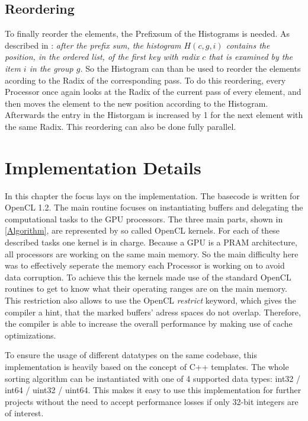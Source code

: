 \documentclass{llncs}
\begin{document}
\subsection{Reordering}
To finally reorder the elements, the Prefixsum of the Histograms is needed. As described in \cite{ocl-radix-helluy}: \textit{after the prefix sum, the histogram $H(c, g, i)$ contains the position, in the ordered list, of the first key with radix $c$ that is examined by the item $i$ in the group $g$.} So the Histogram can than be used to reorder the elements acording to the Radix of the corresponding pass. To do this reordering, every Processor once again looks at the Radix of the current pass of every element, and then moves the element to the new position according to the Histogram. Afterwards the entry in the Historgam is increased by 1 for the next element with the same Radix. This reordering can also be done fully parallel.

\newpage
\section{Implementation Details}
In this chapter the focus lays on the implementation. The basecode is written for OpenCL 1.2. The main routine focuses on instantiating buffers and delegating the computational tasks to the GPU processors. The three main parts, shown in \ref{Algorithm}, are represented by so called OpenCL kernels. For each of these described tasks one kernel is in charge. Because a GPU is a PRAM architecture, all processors are working on the same main memory. So the main difficulty here was to effectively seperate the memory each Processor is working on to avoid data corruption. To achieve this the kernels made use of the standard OpenCL routines to get to know what their operating ranges are on the main memory. This restriction also allows to use the OpenCL \textit{restrict} keyword, which gives the compiler a hint, that the marked buffers' adress spaces do not overlap. Therefore, the compiler is able to increase the overall performance by making use of cache optimizations.

To ensure the usage of different datatypes on the same codebase, this implementation is heavily based on the concept of C++ templates. The whole sorting algorithm can be instantiated with one of 4 supported data types: int32 / int64 / uint32 / uint64. This makes it easy to use this implementation for further projects without the need to accept performance losses if only 32-bit integers are of interest.
\end{document}
